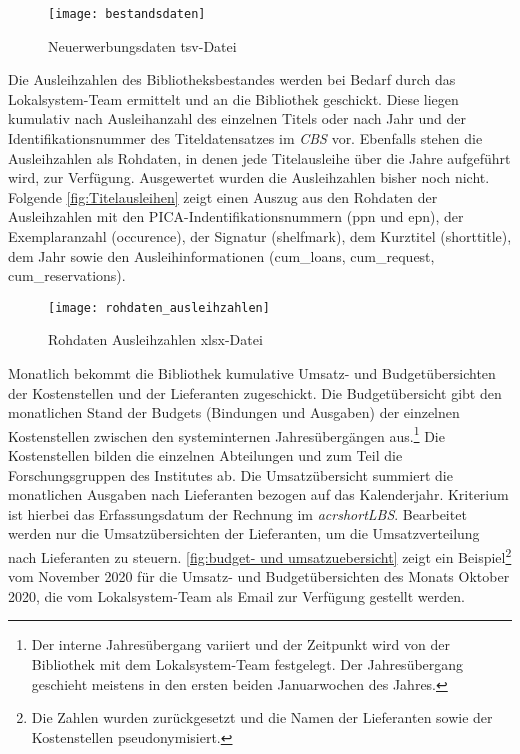 \begin{figure}[H]
    \centering
        \texttt{[image: bestandsdaten]}
        \caption{Neuerwerbungsdaten tsv-Datei}
        \label{fig:Bestandsdaten}
\end{figure}


Die Ausleihzahlen des Bibliotheksbestandes werden bei Bedarf durch das Lokalsystem-Team ermittelt und an die Bibliothek geschickt. 
Diese liegen kumulativ nach Ausleihanzahl des einzelnen Titels oder nach Jahr und der Identifikationsnummer des Titeldatensatzes im 
\textit{\acrshort{CBS}} vor. Ebenfalls stehen die Ausleihzahlen als Rohdaten, in denen jede Titelausleihe über die Jahre aufgeführt wird, zur Verfügung.
Ausgewertet wurden die Ausleihzahlen bisher noch nicht. Folgende \autoref{fig:Titelausleihen} zeigt einen Auszug aus den Rohdaten der Ausleihzahlen mit 
den PICA-Indentifikationsnummern (ppn und epn), der Exemplaranzahl (occurence), der Signatur (shelfmark), dem Kurztitel (shorttitle),
dem Jahr sowie den Ausleihinformationen (cum\_loans, cum\_request, cum\_reservations).


\begin{figure}[H]
    \centering
        \texttt{[image: rohdaten\_ausleihzahlen]}
        \caption{Rohdaten Ausleihzahlen xlsx-Datei}
        \label{fig:Titelausleihen}
\end{figure}


Monatlich bekommt die Bibliothek kumulative Umsatz- und Budgetübersichten der Kostenstellen und der Lieferanten zugeschickt.
Die Budgetübersicht gibt den monatlichen Stand der Budgets (Bindungen und Ausgaben) der einzelnen Kostenstellen zwischen den systeminternen Jahresübergängen aus.\footnote{ Der
interne Jahresübergang variiert und der Zeitpunkt wird von der Bibliothek mit dem Lokalsystem-Team festgelegt. Der Jahresübergang geschieht meistens in den ersten beiden Januarwochen des Jahres.}
Die Kostenstellen bilden die einzelnen Abteilungen und zum Teil die Forschungsgruppen des Institutes ab.
Die Umsatzübersicht summiert die monatlichen Ausgaben nach Lieferanten bezogen auf das Kalenderjahr. Kriterium ist hierbei das Erfassungsdatum der Rechnung im \textit{acrshort{LBS}}. 
Bearbeitet werden nur die Umsatzübersichten der Lieferanten, um die Umsatzverteilung nach Lieferanten zu steuern.
\autoref{fig:budget- und umsatzuebersicht} zeigt ein Beispiel\footnote{ Die Zahlen wurden zurückgesetzt und die Namen der Lieferanten sowie der Kostenstellen pseudonymisiert.} vom November 2020 für die Umsatz- und Budgetübersichten des Monats Oktober 2020, die vom Lokalsystem-Team als Email zur Verfügung gestellt werden.


